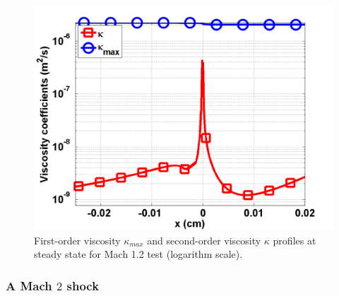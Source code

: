 \begin{figure}[H]
                \centering
                \includegraphics[width=\textwidth]{figures/Mach_1p2_nel_1000_viscosity.png}
        \caption{First-order viscosity $\kappa_{max}$ and second-order viscosity $\kappa$ profiles at steady state for Mach 1.2 test (logarithm scale).}\label{fig:Mach12_viscosity}
\end{figure}

\subsubsection{A Mach $2$ shock}

